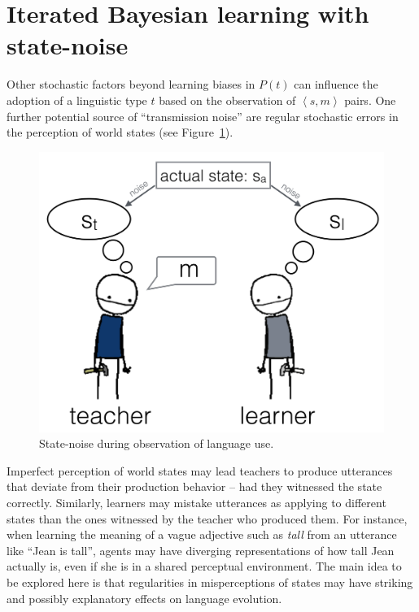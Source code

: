 \documentclass[10pt,a4paper]{article}
\newcommand{\tuple}[1]{\ensuremath{\left\langle #1 \right\rangle}}
\begin{document}

\section{Iterated Bayesian learning with state-noise}

Other stochastic factors beyond learning biases in $P(t)$ can influence the adoption of a
linguistic type $t$ based on the observation of $\tuple{s,m}$ pairs. One further potential source
of ``transmission noise'' are regular stochastic errors in the perception of world states (see
Figure~\ref{fig:cartoon}).
%
\begin{figure}[t]
  \centering
  \includegraphics[width = 0.75\linewidth]{pics/cartoon_picture.png}
  \caption{State-noise during observation of language use.}
  \label{fig:cartoon}
\end{figure}
% 
Imperfect perception of world states may lead teachers to produce utterances that deviate from
their production behavior -- had they witnessed the state correctly. Similarly, learners may
mistake utterances as applying to different states than the ones witnessed by the teacher who
produced them. For instance, when learning the meaning of a vague adjective such as {\em tall}
from an utterance like ``Jean is tall'', agents may have diverging representations of how tall
Jean actually is, even if she is in a shared perceptual environment. The main idea to be
explored here is that regularities in misperceptions of states may have striking and possibly
explanatory effects on language evolution.
\end{document}
